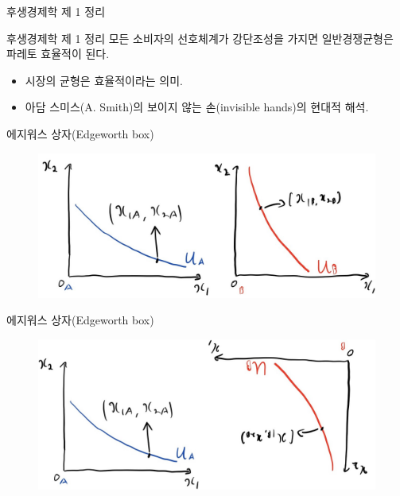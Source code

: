 \documentclass[aspectratio=169,xcolor=dvipsnames,handout]{beamer}
\begin{document}
\begin{frame}{후생경제학 제 1 정리}
    \begin{block}{후생경제학 제 1 정리}
        모든 소비자의 선호체계가 강단조성을 가지면 일반경쟁균형은 파레토 효율적이 된다.
    \end{block}
    \begin{itemize}
        \item 시장의 균형은 효율적이라는 의미.
        \item 아담 스미스(A. Smith)의 보이지 않는 손(invisible hands)의 현대적 해석.
    \end{itemize}
\end{frame}    

\begin{frame}{에지워스 상자(Edgeworth box)}
    \begin{figure}
        \centering
        \includegraphics[scale=.35]{pic/2p-1.jpg}
    \end{figure}
\end{frame}

\begin{frame}{에지워스 상자(Edgeworth box)}
    \begin{figure}
        \centering
        \includegraphics[scale=.35]{pic/2p-2.jpg}
    \end{figure}
\end{frame}
\end{document}
